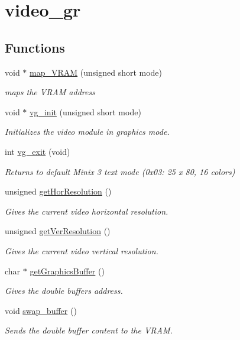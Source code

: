 \hypertarget{group__video__gr}{}\section{video\+\_\+gr}
\label{group__video__gr}
\subsection*{Functions}
\begin{DoxyCompactItemize}
\item 
void $\ast$ \hyperlink{group__video__gr_ga06d4b54021d33d2447a61b9de3982810}{map\+\_\+\+V\+R\+AM} (unsigned short mode)
\begin{DoxyCompactList}\small\item\em maps the V\+R\+AM address \end{DoxyCompactList}\item 
void $\ast$ \hyperlink{group__video__gr_gacef21667c79365d57a084bed994c2189}{vg\+\_\+init} (unsigned short mode)
\begin{DoxyCompactList}\small\item\em Initializes the video module in graphics mode. \end{DoxyCompactList}\item 
int \hyperlink{group__video__gr_ga42f593e6656f1a978315aff02b1bcebf}{vg\+\_\+exit} (void)
\begin{DoxyCompactList}\small\item\em Returns to default Minix 3 text mode (0x03\+: 25 x 80, 16 colors) \end{DoxyCompactList}\item 
unsigned \hyperlink{group__video__gr_gae2b9b38f4f97e1c580123c8e9a993353}{get\+Hor\+Resolution} ()
\begin{DoxyCompactList}\small\item\em Gives the current video horizontal resolution. \end{DoxyCompactList}\item 
unsigned \hyperlink{group__video__gr_ga7ee85b0f333d227380a2c43e5fb8507a}{get\+Ver\+Resolution} ()
\begin{DoxyCompactList}\small\item\em Gives the current video vertical resolution. \end{DoxyCompactList}\item 
char $\ast$ \hyperlink{group__video__gr_ga0823d182cf2b320e5f344bdc420a02d0}{get\+Graphics\+Buffer} ()
\begin{DoxyCompactList}\small\item\em Gives the double buffer\textquotesingle{}s address. \end{DoxyCompactList}\item 
void \hyperlink{group__video__gr_gad42c7cf5f54fed0714fcf1f6e5e35bee}{swap\+\_\+buffer} ()
\begin{DoxyCompactList}\small\item\em Sends the double buffer content to the V\+R\+AM. \end{DoxyCompactList}\end{DoxyCompactItemize}


